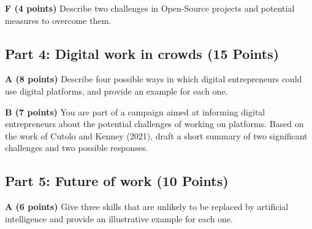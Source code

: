 \documentclass[12pt]{scrartcl}
\begin{document}
\vspace{0.3cm}

\textbf{F (4 points)} Describe two challenges in Open-Source projects and potential measures to overcome them.

\subsection*{Part 4: Digital work in crowds (15 Points)}

\textbf{A (8 points)} Describe four possible ways in which digital entrepreneurs could use digital platforms, and provide an example for each one.

\vspace{0.3cm}

\textbf{B (7 points)} You are part of a campaign aimed at informing digital entrepreneurs about the potential challenges of working on platforms. Based on the work of Cutolo and Kenney (2021), draft a short summary of two significant challenges and two possible responses.

\subsection*{Part 5: Future of work (10 Points)}

\textbf{A (6 points)} Give three skills that are unlikely to be replaced by artificial intelligence and provide an illustrative example for each one.
\end{document}
